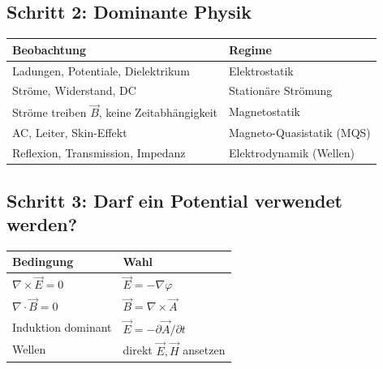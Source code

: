 \documentclass[a4paper]{article}
\newcommand{\imp}[1]{{\color{accent}\bfseries #1}}
\newcommand{\E}{\vec E}
\newcommand{\Hf}{\vec H}
\newcommand{\B}{\vec B}
\newcommand{\A}{\vec A}
\begin{document}
\vspace{2pt}

\subsection*{Schritt 2: Dominante Physik}

\begin{schema}
\begin{tabular}{p{4cm} p{10cm}}
\imp{Beobachtung} & \imp{Regime} \\ \hline
Ladungen, Potentiale, Dielektrikum & Elektrostatik \\
Ströme, Widerstand, DC & Stationäre Strömung \\
Ströme treiben $\B$, keine Zeitabhängigkeit & Magnetostatik \\
AC, Leiter, Skin-Effekt & Magneto-Quasistatik (MQS) \\
Reflexion, Transmission, Impedanz & Elektrodynamik (Wellen) \\
\end{tabular}
\end{schema}

\vspace{2pt}

\subsection*{Schritt 3: Darf ein Potential verwendet werden?}

\begin{schema}
\begin{tabular}{p{4cm} p{10cm}}
\imp{Bedingung} & \imp{Wahl} \\ \hline
$\nabla\times\E=0$ & $\E=-\nabla\varphi$ \\
$\nabla\cdot\B=0$ & $\B=\nabla\times\A$ \\
Induktion dominant & $\E=-\partial\A/\partial t$ \\
Wellen & direkt $\E,\Hf$ ansetzen \\
\end{tabular}
\end{schema}

\vspace{2pt}

\end{document}
